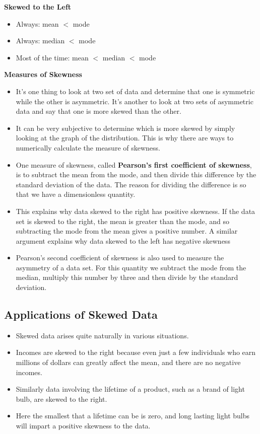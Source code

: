 \noindent \textbf{Skewed to the Left}
\begin{itemize}
\item Always: mean $<$ mode
\item Always: median $<$ mode
\item Most of the time: mean $<$ median $<$ mode
\end{itemize}








\textbf{Measures of Skewness}
\begin{itemize}
\item It’s one thing to look at two set of data and determine that one is symmetric while the other is asymmetric. It’s another to look at two sets of asymmetric data and say that one is more skewed than the other. 
\item It can be very subjective to determine which is more skewed by simply looking at the graph of the distribution. This is why there are ways to numerically calculate the measure of skewness.
\item One measure of skewness, called \textbf{Pearson’s first coefficient of skewness}, is to subtract the mean from the mode, and then divide this difference by the standard deviation of the data. The reason for dividing the difference is so that we have a dimensionless quantity. 

\item This explains why data skewed to the right has positive skewness. If the data set is skewed to the right, the mean is greater than the mode, and so subtracting the mode from the mean gives a positive number. A similar argument explains why data skewed to the left has negative skewness
\item Pearson’s second coefficient of skewness is also used to measure the asymmetry of a data set. For this quantity we subtract the mode from the median, multiply this number by three and then divide by the standard deviation.
\end{itemize}



\subsection{Applications of Skewed Data}

\begin{itemize}
\item Skewed data arises quite naturally in various situations. 
\item Incomes are skewed to the right because even just a few individuals who earn millions of dollars can greatly affect the mean, and there are no negative incomes. 
\item Similarly data involving the lifetime of a product, such as a brand of light bulb, are skewed to the right. 
\item Here the smallest that a lifetime can be is zero, and long lasting light bulbs will impart a positive skewness to the data.
\end{itemize}


